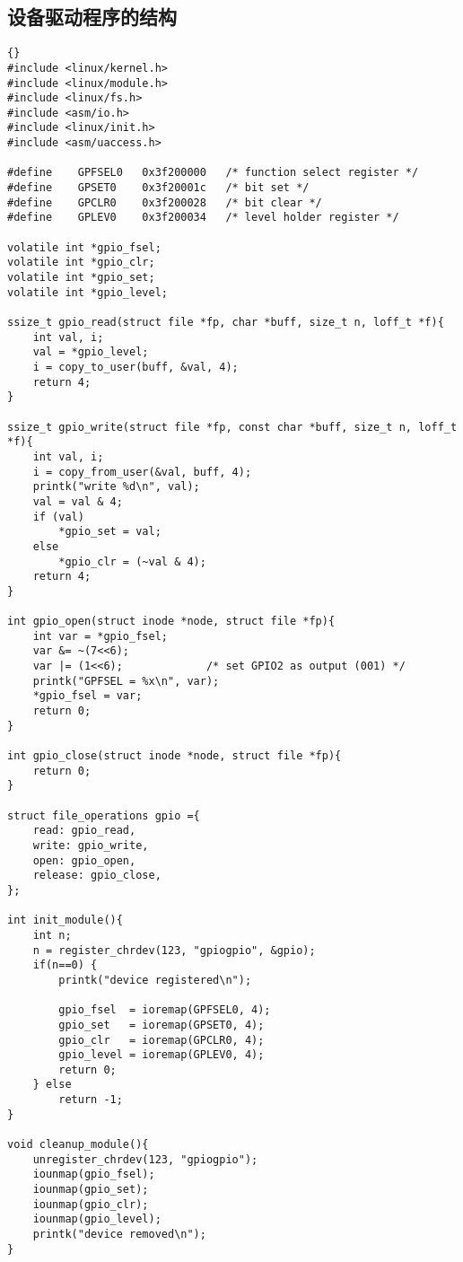 \documentclass[nofonts]{ctexart}
\begin{document}
\subsection{设备驱动程序的结构}
\begin{lstlisting}[caption={[清单]gpio.c},label=gpio]{}
#include <linux/kernel.h>
#include <linux/module.h>
#include <linux/fs.h>
#include <asm/io.h>
#include <linux/init.h>
#include <asm/uaccess.h>

#define    GPFSEL0   0x3f200000   /* function select register */
#define    GPSET0    0x3f20001c   /* bit set */
#define    GPCLR0    0x3f200028   /* bit clear */
#define    GPLEV0    0x3f200034   /* level holder register */

volatile int *gpio_fsel;
volatile int *gpio_clr;
volatile int *gpio_set;
volatile int *gpio_level;

ssize_t gpio_read(struct file *fp, char *buff, size_t n, loff_t *f){
    int val, i;
    val = *gpio_level;
    i = copy_to_user(buff, &val, 4);
    return 4;
}

ssize_t gpio_write(struct file *fp, const char *buff, size_t n, loff_t *f){
    int val, i;
    i = copy_from_user(&val, buff, 4);
    printk("write %d\n", val);
    val = val & 4;
    if (val)
        *gpio_set = val;
    else
        *gpio_clr = (~val & 4);
    return 4;
}

int gpio_open(struct inode *node, struct file *fp){
    int var = *gpio_fsel;
    var &= ~(7<<6);
    var |= (1<<6);             /* set GPIO2 as output (001) */
    printk("GPFSEL = %x\n", var);
    *gpio_fsel = var;
    return 0;
}

int gpio_close(struct inode *node, struct file *fp){
    return 0;
}

struct file_operations gpio ={
    read: gpio_read,
    write: gpio_write,
    open: gpio_open,
    release: gpio_close,
};

int init_module(){
    int n;
    n = register_chrdev(123, "gpiogpio", &gpio);
    if(n==0) {
        printk("device registered\n");

        gpio_fsel  = ioremap(GPFSEL0, 4);
        gpio_set   = ioremap(GPSET0, 4);
        gpio_clr   = ioremap(GPCLR0, 4);
        gpio_level = ioremap(GPLEV0, 4);
        return 0;
    } else
        return -1;
}

void cleanup_module(){
    unregister_chrdev(123, "gpiogpio");
    iounmap(gpio_fsel);
    iounmap(gpio_set);
    iounmap(gpio_clr);
    iounmap(gpio_level);
    printk("device removed\n");
}
\end{lstlisting}
\end{document}
